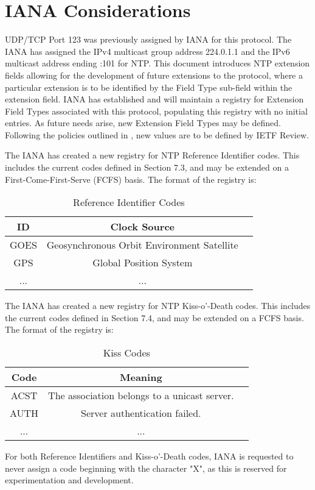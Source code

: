 \chapter{IANA Considerations}

UDP/TCP Port 123 was previously assigned by IANA for this protocol.
The IANA has assigned the IPv4 multicast group address 224.0.1.1 and
the IPv6 multicast address ending :101 for NTP.  This document
introduces NTP extension fields allowing for the development of
future extensions to the protocol, where a particular extension is to
be identified by the Field Type sub-field within the extension field.
IANA has established and will maintain a registry for Extension Field
Types associated with this protocol, populating this registry with no
initial entries.  As future needs arise, new Extension Field Types
may be defined.  Following the policies outlined in \cite{RFC5226}, new
values are to be defined by IETF Review.

The IANA has created a new registry for NTP Reference Identifier
codes.  This includes the current codes defined in Section 7.3, and
may be extended on a First-Come-First-Serve (FCFS) basis.  The format
of the registry is:

\begin{table}[htb]
\center
\begin{tabular}{c | c | c}
ID   & Clock Source \\
\hline
\hline
GOES & Geosynchronous Orbit Environment Satellite \\
GPS  & Global Position System                     \\
...  & ...                                        \\
\hline
\end{tabular}
\label{reference_identifier_codes}
\caption{Reference Identifier Codes}
\end{table}

The IANA has created a new registry for NTP Kiss-o'-Death codes.
This includes the current codes defined in Section 7.4, and may be
extended on a FCFS basis.  The format of the registry is:

\begin{table}[htb]
\center
\begin{tabular}{c | c | c}
Code & Meaning \\
\hline
\hline
ACST & The association belongs to a unicast server. \\
AUTH & Server authentication failed. \\
...  & ... \\
\hline
\end{tabular}
\label{kiss_codes}
\caption{Kiss Codes}
\end{table}

For both Reference Identifiers and Kiss-o'-Death codes, IANA is
requested to never assign a code beginning with the character "X", as
this is reserved for experimentation and development.
